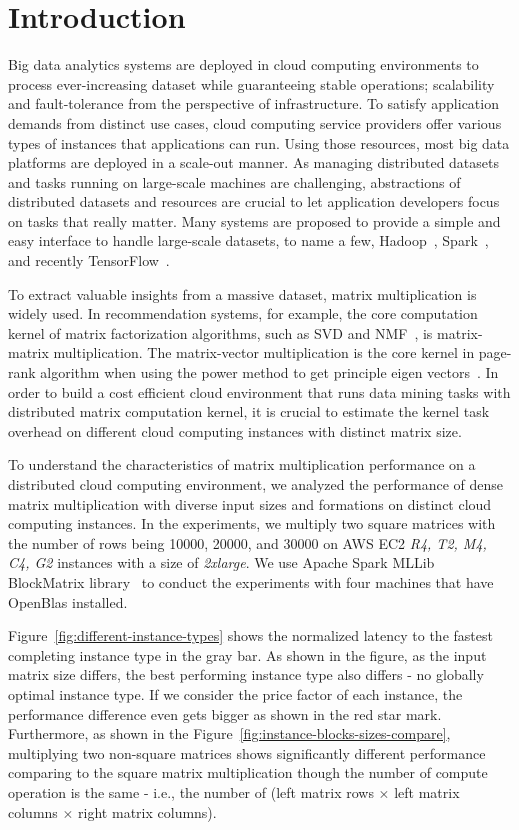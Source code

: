 \documentclass[10pt, conference, compsocconf]{IEEEtran}
\begin{document}
\section{Introduction}\label{sec:intro}
Big data analytics systems are deployed in cloud computing environments to process ever-increasing dataset while guaranteeing stable operations; scalability and fault-tolerance from the perspective of infrastructure. To satisfy application demands from distinct use cases, cloud computing service providers offer various types of instances that applications can run. Using those resources, most big data platforms are deployed in a scale-out manner. As managing distributed datasets and tasks running on large-scale machines are challenging, abstractions of distributed datasets and resources are crucial to let application developers focus on tasks that really matter. Many systems are proposed to provide a simple and easy interface to handle large-scale datasets, to name a few, Hadoop~\cite{hadoop}, Spark~\cite{spark}, and recently TensorFlow~\cite{tensorflow}.

To extract valuable insights from a massive dataset, matrix multiplication is widely used. In recommendation systems, for example, the core computation kernel of matrix factorization algorithms, such as SVD and NMF~\cite{nmf}, is matrix-matrix multiplication. The matrix-vector multiplication is the core kernel in page-rank algorithm when using the power method to get principle eigen vectors~\cite{pagerank}. In order to build a cost efficient cloud environment that runs data mining tasks with distributed matrix computation kernel, it is crucial to estimate the kernel task overhead on different cloud computing instances with distinct matrix size. 

To understand the characteristics of matrix multiplication performance on a distributed cloud computing environment, we analyzed the performance of dense matrix multiplication with diverse input sizes and formations on distinct cloud computing instances. In the experiments, we multiply two square matrices with the number of rows being 10000, 20000, and 30000 on AWS EC2 \textit{R4, T2, M4, C4, G2} instances with a size of \textit{2xlarge}. We use Apache Spark MLLib BlockMatrix library~\cite{spark-mm} to conduct the experiments with four machines that have OpenBlas installed. 

Figure~\ref{fig:different-instance-types} shows the normalized latency to the fastest completing instance type in the gray bar. As shown in the figure, as the input matrix size differs, the best performing instance type also differs - no globally optimal instance type. If we consider the price factor of each instance, the performance difference even gets bigger as shown in the red star mark. Furthermore, as shown in the Figure~\ref{fig:instance-blocks-sizes-compare}, multiplying two non-square matrices shows significantly different performance comparing to the square matrix multiplication though the number of compute operation is the same - i.e., the number of (left matrix rows $\times$ left matrix columns $\times$ right matrix columns).
\end{document}
